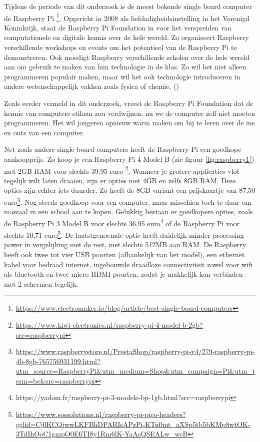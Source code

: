 Tijdens de periode van dit onderzoek is de meest bekende single board computer de Raspberry Pi \footnote{\url{https://www.electromaker.io/blog/article/best-single-board-computers}}. Opgericht in 2008  als liefdadigheidsinstelling in het Verenigd Koninkrijk, staat de Raspberry Pi Foundation in voor het verspreiden van computationele en digitale kennis over de hele wereld.
Zo organiseert Raspberry verschillende workshops en events om het potentieel van de Raspberry Pi te demonstreren. Ook moedigt Raspberry verschillende scholen over de hele wereld aan om gebruik te maken van hun technologie in de klas. Zo wil het niet alleen programmeren populair maken, maar wil het ook technologie introduceren in andere wetenschappelijk vakken zoals fysica of chemie.
(\cite{Foundation})


Zoals eerder vermeld in dit onderzoek, vreest de Raspberry Pi Foundation dat de kennis van computers stilaan zou verdwijnen, nu we de computer zelf niet moeten programmeren. Het wil jongeren opnieuw warm maken om bij te leren over de ins en outs van een computer.

Net zoals andere single board computers heeft de Raspberry Pi een goedkope aankoopprijs. Zo koop je een Raspberry Pi 4 Model B (zie figuur \ref{fig:raspberry1}) met 2GB RAM voor slechts 39,95 euro \footnote{\url{https://www.kiwi-electronics.nl/raspberry-pi-4-model-b-2gb?src=raspberrypi}}. Wanneer je grotere applicaties vlot tegelijk wilt laten draaien, zijn er opties met 4GB en zelfs 8GB RAM. Deze opties zijn echter iets duurder. Zo heeft de 8GB variant een prijskaartje van 87,50 euro\footnote{\url{https://www.raspberrystore.nl/PrestaShop/raspberry-pi-v4/279-raspberry-pi-4b-8gb-765756931199.html?utm_source=RaspberryPi&utm_medium=Shop&utm_campaign=Pi&utm_term=be&src=raspberrypi}}. Nog steeds goedkoop voor een computer, maar misschien toch te duur om massaal in een school aan te kopen. Gelukkig bestaan er goedkopere opties, zoals de Raspberry Pi 3 Model B voor slechts 36,95 euro\footnote{https://yadom.fr/raspberry-pi-3-modele-bp-1gb.html?src=raspberrypi} of de Raspberry Pi voor slechts 10,71 euro\footnote{\url{https://www.sossolutions.nl/raspberry-pi-pico-headers?gclid=Cj0KCQjwwLKFBhDPARIsAPzPi-KTn0mt_aXSp5tb5bKMp8wtOK-3TdIhOoC1gmpO0E6TI8y1Rm6lK-YaAsQSEALw_wcB}}. De laatstgenoemde optie heeft duidelijk minder processing power in vergelijking met de rest, met slechts 512MB aan RAM.
De Raspberry heeft ook twee tot vier USB poorten (afhankelijk van het model), een ethernet kabel voor bedraad internet, ingebouwde draadloze connectiviteit zowel voor wifi als bluetooth en twee micro HDMI-poorten, zodat je makkelijk kan verbinden met 2 schermen tegelijk.

